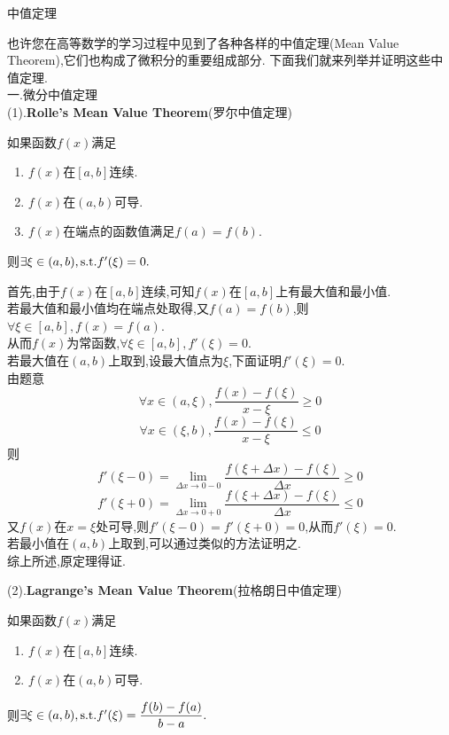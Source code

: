 \documentclass{ctexart}
\begin{document}
\pagestyle{empty}
\begin{center}\large 中值定理\end{center}
也许您在高等数学的学习过程中见到了各种各样的中值定理(Mean Value Theorem),它们也构成了微积分的重要组成部分.
下面我们就来列举并证明这些中值定理.\\
一.微分中值定理\\
(1).\textbf{Rolle's Mean Value Theorem}(罗尔中值定理)
\begin{formal}
    如果函数$f(x)$满足
    \begin{enumerate}[leftmargin=*,label=(\alph*)]
        \item $f(x)$在$[a,b]$连续.
        \item $f(x)$在$(a,b)$可导.
        \item $f(x)$在端点的函数值满足$f(a)=f(b)$.
    \end{enumerate}
    则$\exists\xi\in(a,b),\text{s.t.} f'(\xi)=0.$
\end{formal}
\begin{solution}[Proof.]
    首先,由于$f(x)$在$[a,b]$连续,可知$f(x)$在$[a,b]$上有最大值和最小值.\\
    若最大值和最小值均在端点处取得,又$f(a)=f(b)$,则$\forall \xi\in[a,b],f(x)=f(a)$.\\
    从而$f(x)$为常函数,$\forall\xi\in[a,b],f'(\xi)=0$.\\
    若最大值在$(a,b)$上取到,设最大值点为$\xi$,下面证明$f'(\xi)=0$.\\
    由题意$$\forall x\in(a,\xi),\dfrac{f(x)-f(\xi)}{x-\xi}\geqslant 0$$
    $$\forall x\in(\xi,b),\dfrac{f(x)-f(\xi)}{x-\xi}\leqslant 0$$
    则$$f'(\xi-0)=\lim_{\Delta x\to 0-0}{\dfrac{f(\xi+\Delta x)-f(\xi)}{\Delta x}}\geqslant 0$$
    $$f'(\xi+0)=\lim_{\Delta x\to 0+0}{\dfrac{f(\xi+\Delta x)-f(\xi)}{\Delta x}}\leqslant 0$$
    又$f(x)$在$x=\xi$处可导,则$f'(\xi-0)=f'(\xi+0)=0$,从而$f'(\xi)=0$.\\
    若最小值在$(a,b)$上取到,可以通过类似的方法证明之.\\
    综上所述,原定理得证.
\end{solution}\noindent
(2).\textbf{Lagrange's Mean Value Theorem}(拉格朗日中值定理)
\begin{formal}
    如果函数$f(x)$满足
    \begin{enumerate}[leftmargin=*,label=(\alph*)]
        \item $f(x)$在$[a,b]$连续.
        \item $f(x)$在$(a,b)$可导.
    \end{enumerate}
    则$\exists\xi\in(a,b),\text{s.t.} f'(\xi)=\dfrac{f(b)-f(a)}{b-a}.$
\end{formal}
\end{document}
